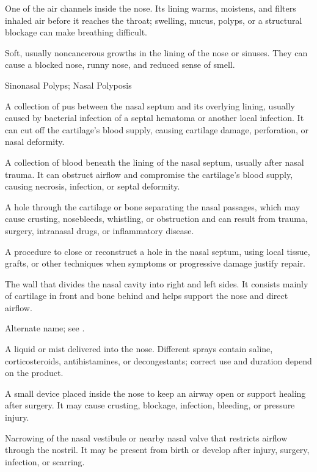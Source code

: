 One of the air channels inside the nose. Its lining warms, moistens, and filters inhaled air before it reaches the throat; swelling, mucus, polyps, or a structural blockage can make breathing difficult.

 Soft, usually noncancerous growths in the lining of the nose or sinuses. They can cause a blocked nose, runny nose, and reduced sense of smell.

\synonyms
Sinonasal Polyps; Nasal Polyposis

 A collection of pus between the nasal septum and its overlying lining, usually caused by bacterial infection of a septal hematoma or another local infection. It can cut off the cartilage's blood supply, causing cartilage damage, perforation, or nasal deformity.

 A collection of blood beneath the lining of the nasal septum, usually after nasal trauma. It can obstruct airflow and compromise the cartilage's blood supply, causing necrosis, infection, or septal deformity.

 A hole through the cartilage or bone separating the nasal passages, which may cause crusting, nosebleeds, whistling, or obstruction and can result from trauma, surgery, intranasal drugs, or inflammatory disease.

 A procedure to close or reconstruct a hole in the nasal septum, using local tissue, grafts, or other techniques when symptoms or progressive damage justify repair.

 The wall that divides the nasal cavity into right and left sides. It consists mainly of cartilage in front and bone behind
and helps support the nose and direct airflow.

 Alternate name; see .

 A liquid or mist delivered into the nose. Different sprays contain saline, corticosteroids, antihistamines, or decongestants; correct use and duration depend on the product.

 A small device placed inside the nose to keep an airway open or support healing after surgery. It may cause crusting, blockage, infection, bleeding, or pressure injury.

 Narrowing of the nasal vestibule or nearby nasal valve that restricts airflow through the nostril. It may be present from birth or develop after injury, surgery, infection, or scarring.

